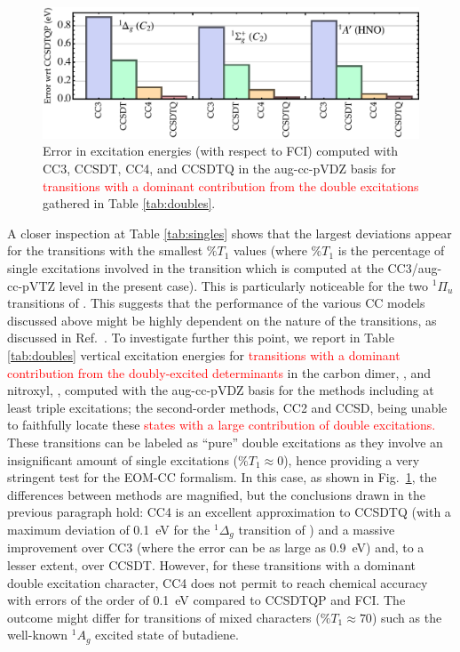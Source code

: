 \documentclass[aip,jcp,reprint,noshowkeys,superscriptaddress]{revtex4-1}
\newcommand{\alert}[1]{\textcolor{red}{#1}}
\newcommand{\titou}[1]{\textcolor{red}{#1}}
\begin{document}
\begin{figure}
	\includegraphics[width=0.7\linewidth]{fig2}
	\caption{
	Error in excitation energies (with respect to FCI) computed with CC3, CCSDT, CC4, and CCSDTQ in the aug-cc-pVDZ basis
	for \alert{transitions with a dominant contribution from the double excitations} gathered in Table \ref{tab:doubles}.
	\label{fig:doubles}}
\end{figure}

A closer inspection at Table \ref{tab:singles} shows that the largest deviations appear for the transitions with the smallest $\%T_1$ values (where $\%T_1$ is the percentage of single excitations involved in the transition which is computed at the CC3/aug-cc-pVTZ level in the present case). 
This is particularly noticeable for the two $^1\Pi_u$ transitions of .
This suggests that the performance of the various CC models discussed above might be highly dependent on the nature of the transitions, as discussed in Ref.~.
To investigate further this point, we report in Table \ref{tab:doubles} vertical excitation energies for \titou{transitions with a dominant contribution from the doubly-excited determinants} in the carbon dimer, , and nitroxyl, , computed with the aug-cc-pVDZ basis for the methods including at least triple excitations; the second-order methods, CC2 and CCSD, being unable to faithfully locate these \titou{states with a large contribution of double excitations.}
These transitions can be labeled as ``pure'' double excitations as they involve an insignificant amount of single excitations ($\%T_1 \approx 0$), hence providing a very stringent test for the EOM-CC formalism.
In this case, as shown in Fig.~\ref{fig:doubles}, the differences between methods are magnified, but the conclusions drawn in the previous paragraph hold: CC4 is an excellent approximation to CCSDTQ (with a maximum deviation of \SI{0.1}{\eV} for the $^1\Delta_g$ transition of ) and a massive improvement over CC3 (where the error can be as large as \SI{0.9}{\eV}) and, to a lesser extent, over CCSDT.
However, for these transitions with a dominant double excitation character, CC4 does not permit to reach chemical accuracy with errors of the order of \SI{0.1}{\eV} compared to CCSDTQP and FCI.
The outcome might differ for transitions of mixed characters ($\%T_1 \approx 70$) such as the well-known $^1 A_g$ excited state of butadiene.\cite{Maitra_2004,Saha_2006,Watson_2012,Shu_2017,Barca_2018a,Loos_2019} 
\end{document}
